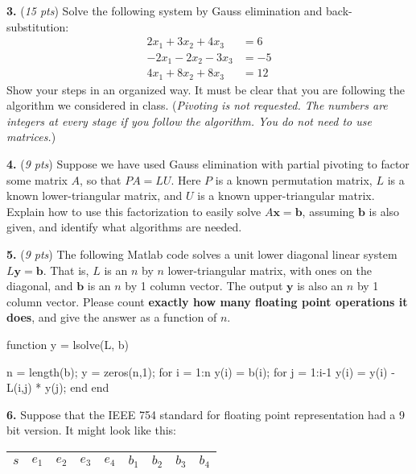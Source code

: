 \documentclass[11pt]{amsart}
\newcommand{\bb}{\mathbf{b}}
\newcommand{\bx}{\mathbf{x}}
\newcommand{\by}{\mathbf{y}}
\newcommand{\prob}[1]{\bigskip\noindent\textbf{#1.} }
\newcommand{\pts}[1]{(\emph{#1 pts})}
\newcommand{\probpts}[2]{\prob{#1} \pts{#2} \quad}
\begin{document}
\bigskip


\newpage
\probpts{3}{15}  Solve the following system by Gauss elimination and back-substitution:
\begin{align*}
 2 x_1 + 3 x_2 + 4 x_3 &= 6 \\
-2 x_1 - 2 x_2 - 3 x_3 &= -5 \\
 4 x_1 + 8 x_2 + 8 x_3 &= 12
\end{align*}
Show your steps in an organized way.  It must be clear that you are following the algorithm we considered in class.  (\emph{Pivoting is \emph{not} requested.  The numbers are integers at every stage if you follow the algorithm.  You do not need to use matrices.})

\vfill


\newpage
\probpts{4}{9}  Suppose we have used Gauss elimination with partial pivoting to factor some matrix $A$, so that $PA=LU$.  Here $P$ is a known permutation matrix, $L$ is a known lower-triangular matrix, and $U$ is a known upper-triangular matrix.  Explain how to use this factorization to easily solve $A \bx = \bb$, assuming $\bb$ is also given, and identify what algorithms are needed.
\vfill

\probpts{5}{9}  The following Matlab code solves a unit lower diagonal linear system $L\by = \bb$.  That is, $L$ is an $n$ by $n$ lower-triangular matrix, with ones on the diagonal, and $\bb$ is an $n$ by 1 column vector.  The output $\by$ is also an $n$ by 1 column vector.  Please count \textbf{exactly how many floating point operations it does}, and give the answer as a function of $n$.

\begin{mVerb}
function y = lsolve(L, b)

n = length(b);                        %
y = zeros(n,1);                       %
for i = 1:n                           %
    y(i) = b(i);                      %
    for j = 1:i-1
        y(i) = y(i) - L(i,j) * y(j);  %
    end
end
\end{mVerb}
\vfill


\newpage
\prob{6}  Suppose that the IEEE 754 standard for floating point representation had a 9 bit version.  It might look like this:

\medskip\large
\begin{center}
\begin{tabular}{|c|c|c|c|c|c|c|c|c|} \hline
$s$ & $e_1$ & $e_2$ & $e_3$ & $e_4$ & $b_1$ & $b_2$ & $b_3$ & $b_4$ \\ \hline
\end{tabular}
\end{center}
\medskip\normalsize
\end{document}
